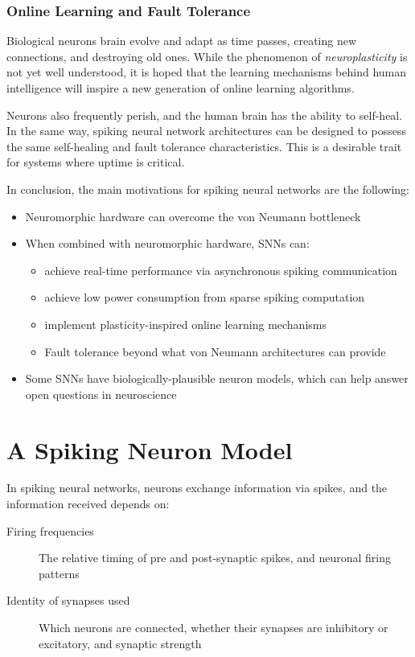 \documentclass[fyp]{socreport}
\begin{document}
\subsubsection{Online Learning and Fault Tolerance}

Biological neurons brain evolve and adapt as time passes, creating new
connections, and destroying old ones. While the phenomenon of
\emph{neuroplasticity} is not yet well understood, it is hoped that the learning
mechanisms behind human intelligence will inspire a new generation of online
learning algorithms.

Neurons also frequently perish, and the human brain has the ability to
self-heal. In the same way, spiking neural network architectures can be designed
to possess the same self-healing and fault tolerance characteristics. This is a
desirable trait for systems where uptime is critical.

In conclusion, the main motivations for spiking neural networks are the
following:

\begin{itemize}
  \item Neuromorphic hardware can overcome the von Neumann bottleneck
  \item When combined with neuromorphic hardware, SNNs can:
  \begin{itemize}
    \item achieve real-time performance via asynchronous spiking communication
    \item achieve low power consumption from sparse spiking computation
    \item implement plasticity-inspired online learning mechanisms
    \item Fault tolerance beyond what von Neumann architectures can provide
  \end{itemize}
  \item Some SNNs have biologically-plausible neuron models, which can help
  answer open questions in neuroscience
\end{itemize}

\section{A Spiking Neuron Model\label{sec:spiking-neuron-model}}
In spiking neural networks, neurons exchange information via spikes, and the
information received depends on:

\begin{description}
\item[{Firing frequencies}] The relative timing of pre and post-synaptic spikes,
and neuronal firing patterns
\item[{Identity of synapses used}] Which neurons are connected, whether their
synapses are inhibitory or excitatory, and synaptic strength
\end{description}
\end{document}
